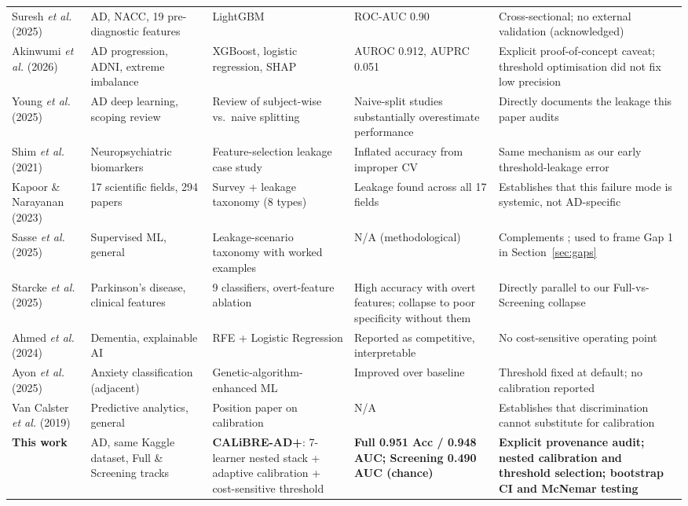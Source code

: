 \documentclass[conference]{IEEEtran}
\begin{document}
\begin{table}[!t]
\begin{tabular}{@{}p{2.6cm}p{2.6cm}p{3.3cm}p{2.7cm}p{4.3cm}@{}}
Suresh \textit{et al.} \cite{b28} (2025) & AD, NACC, 19 pre-diagnostic features & LightGBM & ROC-AUC 0.90 & Cross-sectional; no external validation (acknowledged) \\
Akinwumi \textit{et al.} \cite{b39} (2026) & AD progression, ADNI, extreme imbalance & XGBoost, logistic regression, SHAP & AUROC 0.912, AUPRC 0.051 & Explicit proof-of-concept caveat; threshold optimisation did not fix low precision \\
Young \textit{et al.} \cite{b29} (2025) & AD deep learning, scoping review & Review of subject-wise vs.\ naive splitting & Naive-split studies substantially overestimate performance & Directly documents the leakage this paper audits \\
Shim \textit{et al.} \cite{b30} (2021) & Neuropsychiatric biomarkers & Feature-selection leakage case study & Inflated accuracy from improper CV & Same mechanism as our early threshold-leakage error \\
Kapoor \& Narayanan \cite{b40} (2023) & 17 scientific fields, 294 papers & Survey + leakage taxonomy (8 types) & Leakage found across all 17 fields & Establishes that this failure mode is systemic, not AD-specific \\
Sasse \textit{et al.} \cite{b41} (2025) & Supervised ML, general & Leakage-scenario taxonomy with worked examples & N/A (methodological) & Complements \cite{b40}; used to frame Gap 1 in Section~\ref{sec:gaps} \\
Starcke \textit{et al.} \cite{b42} (2025) & Parkinson's disease, clinical features & 9 classifiers, overt-feature ablation & High accuracy with overt features; collapse to poor specificity without them & Directly parallel to our Full-vs-Screening collapse \\
Ahmed \textit{et al.} \cite{b22} (2024) & Dementia, explainable AI & RFE + Logistic Regression & Reported as competitive, interpretable & No cost-sensitive operating point \\
Ayon \textit{et al.} \cite{b23} (2025) & Anxiety classification (adjacent) & Genetic-algorithm-enhanced ML & Improved over baseline & Threshold fixed at default; no calibration reported \\
Van Calster \textit{et al.} \cite{b32} (2019) & Predictive analytics, general & Position paper on calibration & N/A & Establishes that discrimination cannot substitute for calibration \\
\textbf{This work} & AD, same Kaggle dataset, Full \& Screening tracks & \textbf{CALiBRE-AD+}: 7-learner nested stack + adaptive calibration + cost-sensitive threshold & \textbf{Full 0.951 Acc / 0.948 AUC; Screening 0.490 AUC (chance)} & \textbf{Explicit provenance audit; nested calibration and threshold selection; bootstrap CI and McNemar testing} \\
\bottomrule
\end{tabular}
\end{table}
\end{document}
